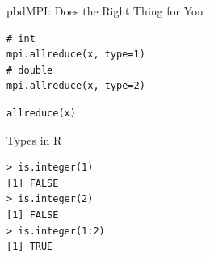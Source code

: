 \begin{frame}[fragile]
  \begin{block}{pbdMPI: Does the Right Thing for You}\pause
    \begin{minipage}[t]{.475\textwidth}
      \begin{lstlisting}[title=Rmpi]
# int
mpi.allreduce(x, type=1)
# double
mpi.allreduce(x, type=2)
      \end{lstlisting}
    \end{minipage}
    \hfill
    \begin{minipage}[t]{.475\textwidth}
      \begin{lstlisting}[title=pbdMPI]
allreduce(x)
      \end{lstlisting}
    \end{minipage}
  \end{block}
  \begin{block}{Types in R}
    \vspace{-.2cm}
    \begin{lstlisting}
> is.integer(1)
[1] FALSE
> is.integer(2)
[1] FALSE
> is.integer(1:2)
[1] TRUE
    \end{lstlisting}
  \end{block}
\end{frame}




